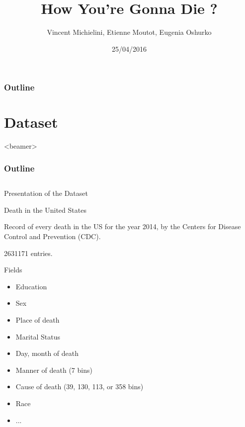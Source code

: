 \documentclass[xcolor=table]{beamer}
\title{How You're Gonna Die ?}
\author{Vincent Michielini, Etienne Moutot, Eugenia Oshurko}
\date{25/04/2016}
\begin{document}
\begin{frame}
\maketitle
\end{frame}

\begin{frame}
  \frametitle{Outline}
  \tableofcontents
\end{frame}

\section{Dataset}
{
     \begin{frame}<beamer>
     \frametitle{Outline}
     \tableofcontents[currentsection]
     \end{frame}
}

\subsection{}
\begin{frame}{Presentation of the Dataset}
  \begin{center}
  {\Large Death in the United States}
  \end{center}
  
  \bigskip
  
  Record of every death in the US for the year 2014, by the  Centers for Disease Control and Prevention (CDC).
  
  \medskip
  
  2631171 entries.
\end{frame}

\begin{frame}{Fields}
  \begin{itemize}
    \item Education
    \item Sex
    \item Place of death
    \item Marital Status
    \item Day, month of death
    \item Manner of death (7 bins)
    \item Cause of death (39, 130, 113, or 358 bins)
    \item Race
    \item ...
  \end{itemize}
\end{frame}
\end{document}
